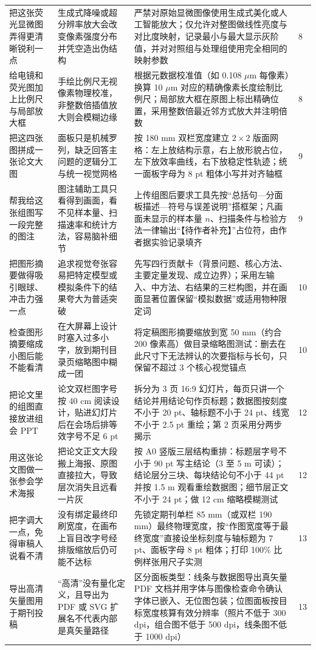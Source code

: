\begin{longtable}{@{}p{26mm}p{28mm}p{56mm}p{10mm}@{}}
把这张荧光显微图弄得更清晰锐利一点 & 生成式降噪或超分辨率放大会改变像素强度分布并凭空造出伪结构 & 严禁对原始显微图像使用生成式美化或人工智能放大；仅允许对整图做线性亮度与对比度映射，记录最小与最大显示灰阶值，并对对照组与处理组使用完全相同的映射参数 & 8 \\
给电镜和荧光图加上比例尺与局部放大框 & 手绘比例尺无视像素物理校准，非整数倍插值放大则会模糊边缘 & 根据元数据校准值（如 0.108 $\mu$m 每像素）换算 10 $\mu$m 对应的精确像素长度绘制比例尺；局部放大框在原图上标出精确位置，采用整数倍最近邻方式放大并注明倍数 & 8 \\
把这四张图拼成一张论文大图 & 面板只是机械罗列，缺乏回答主问题的逻辑分工与统一视觉网格 & 按 180 mm 双栏宽度建立 $2\times 2$ 版面网格：左上放结构示意，右上放形貌占位，左下放效率曲线，右下放稳定性轨迹；统一面板字母为 8 pt 粗体小写并对齐轴框 & 9 \\
帮我给这张组图写一段完整的图注 & 图注辅助工具只看得到画面，看不见样本量、扫描速率和统计方法，容易脑补细节 & 上传组图后要求工具先按“总括句—分面板描述—符号与误差说明”搭框架；凡画面未显示的样本量 $n$、扫描条件与检验方法一律输出“【待作者补充】”占位符，由作者据实验记录填齐 & 9 \\
把图形摘要做得吸引眼球、冲击力强一点 & 追求视觉夸张容易把特定模型或模拟条件下的结果夸大为普适突破 & 先写四行贡献卡（背景问题、核心方法、主要定量发现、成立边界）；采用左输入、中方法、右结果的三栏构图，并在画面显著位置保留“模拟数据”或适用物种限定词 & 10 \\
检查图形摘要缩成小图后能不能看清 & 在大屏幕上设计时塞入过多小字，放到期刊目录页缩略图中糊成一团 & 将定稿图形摘要缩放到宽 50 mm（约合 200 像素高）做目录缩略图测试：删去在此尺寸下无法辨认的次要指标与长句，只保留不超过 3 个核心视觉锚点 & 10 \\
把论文里的组图直接放进组会 PPT & 论文双栏图字号按 40 cm 阅读设计，贴进幻灯片后在会场后排等效字号不足 6 pt & 拆分为 3 页 16:9 幻灯片，每页只讲一个结论并用结论句作页标题；数据图按刻度不小于 20 pt、轴标题不小于 24 pt、线宽不小于 2.5 pt 重绘；第 2 页采用分两步揭示 & 12 \\
用这张论文图做一张参会学术海报 & 把论文正文大段搬上海报、原图直接拉大，导致层次消失且远看一片灰 & 按 A0 竖版三层结构重排：标题层字号不小于 90 pt 写主结论（3 至 5 m 可读）；结论层分三块、每块结论句不小于 44 pt 并按 1.5 m 观看重绘数据图；细节层正文不小于 24 pt；做 12 cm 缩略模糊测试 & 12 \\
把字调大一点，免得审稿人说看不清 & 没有绑定最终印刷宽度，在画布上盲目改字号经排版缩放后仍可能不达标 & 先锁定期刊单栏 85 mm（或双栏 190 mm）最终物理宽度，按“作图宽度等于最终宽度”直接设坐标刻度与轴标题为 7 pt、面板字母 8 pt 粗体；打印 100\% 比例样张用尺子实测 & 13 \\
导出高清矢量图用于期刊投稿 & “高清”没有量化定义，且导出为 PDF 或 SVG 扩展名不代表内部是真矢量路径 & 区分面板类型：线条与数据图导出真矢量 PDF 文档并用字体与图像检查命令确认字体已嵌入、无位图包装；位图面板按目标宽度核算有效分辨率（照片不低于 300 dpi，组合图不低于 500 dpi，线条图不低于 1000 dpi） & 13 \\
\end{longtable}
\endgroup

